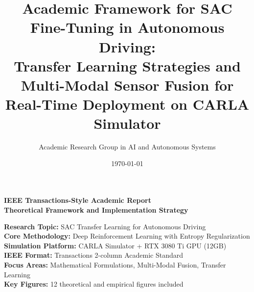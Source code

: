 \documentclass[10pt,a4paper,twocolumn]{article}
\title{\textbf{Academic Framework for SAC Fine-Tuning in Autonomous Driving: \\ Transfer Learning Strategies and Multi-Modal Sensor Fusion for Real-Time Deployment on CARLA Simulator}}
\author{Academic Research Group in AI and Autonomous Systems}
\date{\today}
\begin{document}
\maketitle

\thispagestyle{empty}

\begin{center}
    \vspace{2cm}
    \textbf{\large IEEE Transactions-Style Academic Report}\\[0.5cm]
    \textbf{Theoretical Framework and Implementation Strategy}\\[1cm]
    
    \begin{minipage}{0.48\textwidth}
        \textbf{Research Topic:} SAC Transfer Learning for Autonomous Driving\\
        
        \vspace{0.3cm}
        \textbf{Core Methodology:} Deep Reinforcement Learning with Entropy Regularization\\[0.2cm]
        
        \vspace{0.3cm}
        \textbf{Simulation Platform:} CARLA Simulator + RTX 3080 Ti GPU (12GB)\\[0.2cm]
        
        \vspace{0.3cm}
        \textbf{IEEE Format:} Transactions 2-column Academic Standard\\[0.2cm]
        
        \vspace{0.3cm}
        \textbf{Focus Areas:} Mathematical Formulations, Multi-Modal Fusion, Transfer Learning\\[0.2cm]
        
        \vspace{0.5cm}
        \textbf{Key Figures:} 12 theoretical and empirical figures included\\
    \end{minipage}
\end{center}

\vfill
\end{document}
